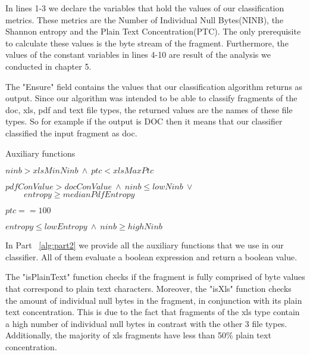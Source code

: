 In lines 1-3 we declare the variables that hold the values of our classification metrics. These metrics are the Number of Individual Null Bytes(NINB), the Shannon entropy and the Plain Text Concentration(PTC). The only prerequisite to calculate these values is the byte stream of the fragment.
Furthermore, the values of the constant variables in lines 4-10 are result of the analysis we conducted in chapter 5. 

The "Ensure" field contains the values that our classification algorithm returns as output. Since our algorithm was intended to be able to classify fragments of the doc, xls, pdf and text file types, the returned values are the names of these file types. So for example if the output is DOC then it means that our classifier classified the input fragment as doc.

\pagebreak

\begin{algorithm}[t]

\caption{Auxiliary functions}
\label{alg:part2}
\begin{algorithmic}[1]

    \State \Return $ninb > xlsMinNinb \ \land \ ptc < xlsMaxPtc$
\EndFunction
\newline

    \State \Return $pdfConValue > docConValue \ \land \ ninb \leq lowNinb \ \lor$
     \State $\ \ \ \ \ \ \ \ \  \  entropy \geq medianPdfEntropy$
\EndFunction
\newline

    \State \Return $ptc == 100$
\EndFunction
\newline

    \State \Return $entropy \leq lowEntropy \ \land \ ninb \geq highNinb$
\EndFunction

\end{algorithmic}
\end{algorithm}
In Part ~\ref{alg:part2} we provide all the auxiliary functions that we use in our classifier. All of them evaluate a boolean expression and return a boolean value.

The "isPlainText" function checks if the fragment is fully comprised of byte values that correspond to plain text characters. Moreover, the "isXls" function checks the amount of individual null bytes in the fragment, in conjunction with its plain text concentration. This is due to the fact that fragments of the xls type contain a high number of individual null bytes in contrast with the other 3 file types. Additionally, the majority of xls fragments have less than 50\% plain text concentration.


